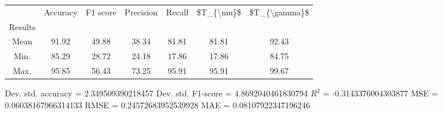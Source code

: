 \begin{tabular}{|c|c|c|c|c|c|c|}
\toprule
{} &  Accuracy &  F1 score &  Precision &  Recall &  \$T\_\{\textbackslash mu\}\$ &  \$T\_\{\textbackslash gamma\}\$ \\
Results &           &           &            &         &            &               \\
\hline
Mean    &     91.92 &     49.88 &      38.34 &   81.81 &      81.81 &         92.43 \\
Min.    &     85.29 &     28.72 &      24.18 &   17.86 &      17.86 &         84.75 \\
Max.    &     95.85 &     56.43 &      73.25 &   95.91 &      95.91 &         99.67 \\
\bottomrule
\end{tabular}

 Dev. std. accuracy = 2.349509390218457
 Dev. std. F1-score = 4.8692040461830794
 $R^2$ = -0.3143376004303877
 MSE = 0.06038167966314133
 RMSE = 0.24572683952539928
 MAE = 0.08107922347196246